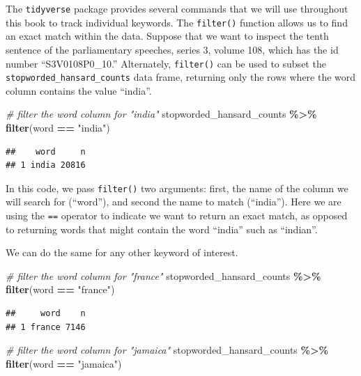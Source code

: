 \documentclass[
]{article}
\newenvironment{Shaded}{\begin{snugshade}}{\end{snugshade}}
\newcommand{\CommentTok}[1]{\textcolor[rgb]{0.56,0.35,0.01}{\textit{#1}}}
\newcommand{\FunctionTok}[1]{\textcolor[rgb]{0.13,0.29,0.53}{\textbf{#1}}}
\newcommand{\NormalTok}[1]{#1}
\newcommand{\SpecialCharTok}[1]{\textcolor[rgb]{0.81,0.36,0.00}{\textbf{#1}}}
\newcommand{\StringTok}[1]{\textcolor[rgb]{0.31,0.60,0.02}{#1}}
\begin{document}
The \texttt{tidyverse} package provides several commands that we will
use throughout this book to track individual keywords. The
\texttt{filter()} function allows us to find an exact match within the
data. Suppose that we want to inspect the tenth sentence of the
parliamentary speeches, series 3, volume 108, which has the id number
``S3V0108P0\_10.'' Alternately, \texttt{filter()} can be used to subset
the \texttt{stopworded\_hansard\_counts} data frame, returning only the
rows where the word column contains the value ``india''.

\begin{Shaded}
\begin{Highlighting}[]
\CommentTok{\# filter the word column for "india"}
\NormalTok{stopworded\_hansard\_counts }\SpecialCharTok{\%\textgreater{}\%} 
  \FunctionTok{filter}\NormalTok{(word }\SpecialCharTok{==} \StringTok{"india"}\NormalTok{)}
\end{Highlighting}
\end{Shaded}

\begin{verbatim}
##    word     n
## 1 india 20816
\end{verbatim}

In this code, we pass \texttt{filter()} two arguments: first, the name
of the column we will search for (``word''), and second the name to
match (``india''). Here we are using the \texttt{==} operator to
indicate we want to return an exact match, as opposed to returning words
that might contain the word ``india'' such as ``indian''.

We can do the same for any other keyword of interest.

\begin{Shaded}
\begin{Highlighting}[]
\CommentTok{\# filter the word column for "france"}
\NormalTok{stopworded\_hansard\_counts }\SpecialCharTok{\%\textgreater{}\%} 
  \FunctionTok{filter}\NormalTok{(word }\SpecialCharTok{==} \StringTok{"france"}\NormalTok{)}
\end{Highlighting}
\end{Shaded}

\begin{verbatim}
##     word    n
## 1 france 7146
\end{verbatim}

\begin{Shaded}
\begin{Highlighting}[]
\CommentTok{\# filter the word column for "jamaica"}
\NormalTok{stopworded\_hansard\_counts }\SpecialCharTok{\%\textgreater{}\%} 
  \FunctionTok{filter}\NormalTok{(word }\SpecialCharTok{==} \StringTok{"jamaica"}\NormalTok{)}
\end{Highlighting}
\end{Shaded}
\end{document}
